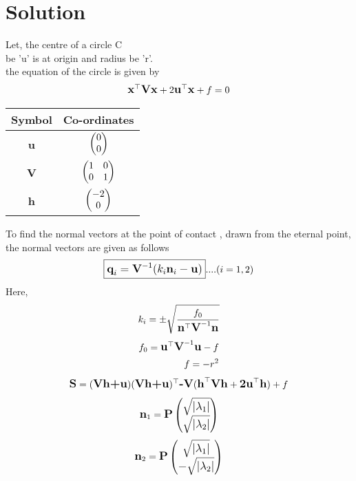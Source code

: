 \section{Solution}
\raggedright Let, the centre of a circle C\\ be 'u' is  at origin and radius be 'r'. \\
 the equation of the circle is given by
 \begin{align}
  \large \textbf{x}^\top\textbf{Vx} + 2\textbf{u}^\top\textbf{x} +f =0
 \end{align}
\centering
\begin{tabular}{|c |c |}
     \hline %
	\large\textbf{Symbol} & \large\textbf{Co-ordinates}  \\
       \hline
	\large \textbf{u} & $\begin{pmatrix}0\\0\end{pmatrix}$  \\
        \hline
	 \large \textbf{V} & $\begin{pmatrix}1&0\\0&1\end{pmatrix}$\\
       \hline
     \large \textbf{h} & $\begin{pmatrix}-2\\0\end{pmatrix}$ \\
        \hline
    \end{tabular}

\raggedright To find the normal vectors at the point of contact , drawn from the eternal point, the normal vectors are given as follows
\begin{align}
\large\boxed{\textbf{q}_{i} = \textbf{V}^{-1}(k_i\textbf{n}_{i}-\textbf{u})}....(i=1,2)
\end{align}
Here,
\begin{align}
\large k_i= \pm\sqrt{\frac{f_0}{\textbf{n}^\top\textbf{V}^{-1}\textbf{n}}}
\end{align} 
\begin{align}
\large f_0=\textbf{u}^\top\textbf{V}^{-1}\textbf{u}-f \\
f=-r^2
\end{align}
\begin{align}
\large  \textbf{S}=(\textbf{Vh+u})(\textbf{Vh+u})^\top\textbf{-}\textbf{V}(\textbf{h}^\top\textbf{Vh}+\textbf{2u}^\top\textbf{h})+f
\end{align}
\begin{align}
\large \textbf{n}_{1}=\textbf{P}\begin{pmatrix} \sqrt{|\lambda_1|} \\ \sqrt{|\lambda_2|} \end{pmatrix} 
\end{align}
\begin{align}
\large \textbf{n}_{2}=\textbf{P}\begin{pmatrix} \sqrt{|\lambda_1|} \\ -\sqrt{|\lambda_2|} \end{pmatrix}
\end{align}

